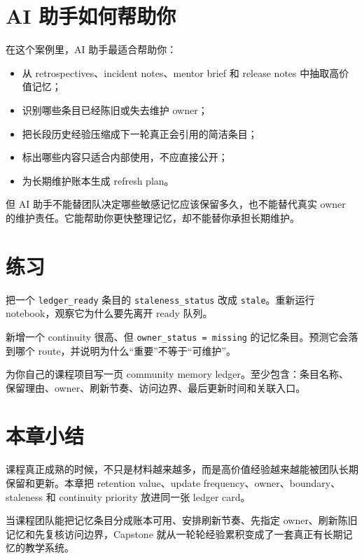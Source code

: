 \section{AI 助手如何帮助你}

在这个案例里，AI 助手最适合帮助你：

\begin{itemize}
    \item 从 retrospectives、incident notes、mentor brief 和 release notes 中抽取高价值记忆；
    \item 识别哪些条目已经陈旧或失去维护 owner；
    \item 把长段历史经验压缩成下一轮真正会引用的简洁条目；
    \item 标出哪些内容只适合内部使用，不应直接公开；
    \item 为长期维护账本生成 refresh plan。
\end{itemize}

但 AI 助手不能替团队决定哪些敏感记忆应该保留多久，也不能替代真实 owner 的维护责任。它能帮助你更快整理记忆，却不能替你承担长期维护。

\section{练习}

\begin{exercisebox}[基础练习]
把一个 \texttt{ledger\_ready} 条目的 \texttt{staleness\_status} 改成 \texttt{stale}。重新运行 notebook，观察它为什么要先离开 ready 队列。
\end{exercisebox}

\begin{exercisebox}[进阶练习]
新增一个 continuity 很高、但 \texttt{owner\_status = missing} 的记忆条目。预测它会落到哪个 route，并说明为什么“重要”不等于“可维护”。
\end{exercisebox}

\begin{exercisebox}[开放练习]
为你自己的课程项目写一页 community memory ledger。至少包含：条目名称、保留理由、owner、刷新节奏、访问边界、最后更新时间和关联入口。
\end{exercisebox}

\section{本章小结}

课程真正成熟的时候，不只是材料越来越多，而是高价值经验越来越能被团队长期保留和更新。本章把 retention value、update frequency、owner、boundary、staleness 和 continuity priority 放进同一张 ledger card。

当课程团队能把记忆条目分成账本可用、安排刷新节奏、先指定 owner、刷新陈旧记忆和先复核访问边界，Capstone 就从一轮轮经验累积变成了一套真正有长期记忆的教学系统。
